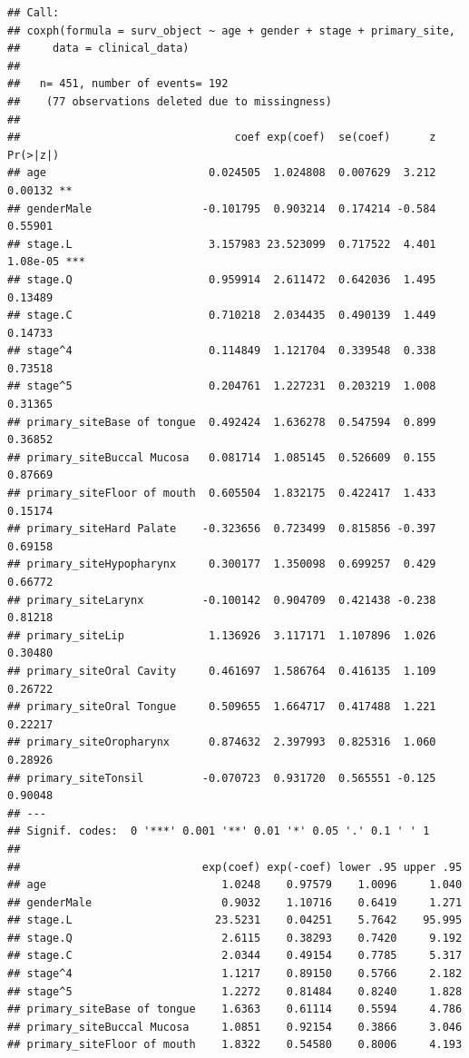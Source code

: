 \documentclass[
  11pt,
]{article}
\begin{document}
\begin{verbatim}
## Call:
## coxph(formula = surv_object ~ age + gender + stage + primary_site, 
##     data = clinical_data)
## 
##   n= 451, number of events= 192 
##    (77 observations deleted due to missingness)
## 
##                                 coef exp(coef)  se(coef)      z Pr(>|z|)    
## age                         0.024505  1.024808  0.007629  3.212  0.00132 ** 
## genderMale                 -0.101795  0.903214  0.174214 -0.584  0.55901    
## stage.L                     3.157983 23.523099  0.717522  4.401 1.08e-05 ***
## stage.Q                     0.959914  2.611472  0.642036  1.495  0.13489    
## stage.C                     0.710218  2.034435  0.490139  1.449  0.14733    
## stage^4                     0.114849  1.121704  0.339548  0.338  0.73518    
## stage^5                     0.204761  1.227231  0.203219  1.008  0.31365    
## primary_siteBase of tongue  0.492424  1.636278  0.547594  0.899  0.36852    
## primary_siteBuccal Mucosa   0.081714  1.085145  0.526609  0.155  0.87669    
## primary_siteFloor of mouth  0.605504  1.832175  0.422417  1.433  0.15174    
## primary_siteHard Palate    -0.323656  0.723499  0.815856 -0.397  0.69158    
## primary_siteHypopharynx     0.300177  1.350098  0.699257  0.429  0.66772    
## primary_siteLarynx         -0.100142  0.904709  0.421438 -0.238  0.81218    
## primary_siteLip             1.136926  3.117171  1.107896  1.026  0.30480    
## primary_siteOral Cavity     0.461697  1.586764  0.416135  1.109  0.26722    
## primary_siteOral Tongue     0.509655  1.664717  0.417488  1.221  0.22217    
## primary_siteOropharynx      0.874632  2.397993  0.825316  1.060  0.28926    
## primary_siteTonsil         -0.070723  0.931720  0.565551 -0.125  0.90048    
## ---
## Signif. codes:  0 '***' 0.001 '**' 0.01 '*' 0.05 '.' 0.1 ' ' 1
## 
##                            exp(coef) exp(-coef) lower .95 upper .95
## age                           1.0248    0.97579    1.0096     1.040
## genderMale                    0.9032    1.10716    0.6419     1.271
## stage.L                      23.5231    0.04251    5.7642    95.995
## stage.Q                       2.6115    0.38293    0.7420     9.192
## stage.C                       2.0344    0.49154    0.7785     5.317
## stage^4                       1.1217    0.89150    0.5766     2.182
## stage^5                       1.2272    0.81484    0.8240     1.828
## primary_siteBase of tongue    1.6363    0.61114    0.5594     4.786
## primary_siteBuccal Mucosa     1.0851    0.92154    0.3866     3.046
## primary_siteFloor of mouth    1.8322    0.54580    0.8006     4.193

\end{verbatim}
\end{document}
